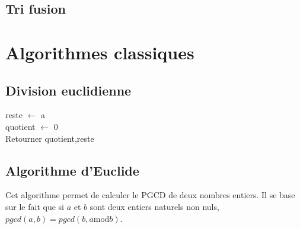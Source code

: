 \documentclass[10pt]{article}
\begin{document}
\subsection{Tri fusion}

\section{Algorithmes classiques}
\subsection{Division euclidienne}
\begin{pseudo}
\begin{algorithm}[H]
reste $\gets$ a\\
quotient $\gets$ 0\\
Retourner quotient,reste
\end{algorithm}
\end{pseudo}

\subsection{Algorithme d'Euclide}
Cet algorithme permet de calculer le PGCD de deux nombres entiers. Il se base sur le fait que si $a$ et $b$ sont deux entiers naturels non nuls, $pgcd(a,b)=pgcd(b, a \text{mod} b)$. 
\end{document}
